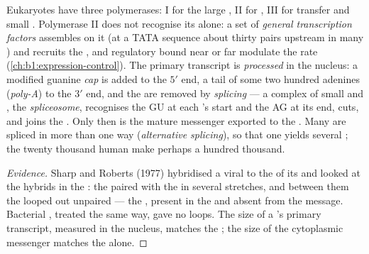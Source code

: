 \begin{proposition}\label{prop:b1:gene-expression:processing}
Eukaryotes have three polymerases: I for the large , II
for , III for transfer and small . Polymerase II does
not recognise its  alone: a set of \emph{general transcription
factors} assembles on it (at a TATA sequence about thirty pairs
upstream in many ) and recruits the , and regulatory
 bound near or far modulate the rate
(\cref{ch:b1:expression-control}). The primary transcript is
\emph{processed} in the nucleus: a modified guanine \emph{cap} is added
to the $5'$ end, a tail of some two hundred adenines (\emph{poly-A})
to the $3'$ end, and the  are removed by \emph{splicing} --- a
complex of small  and , the \emph{spliceosome}, recognises
the GU at each 's start and the AG at its end, cuts, and joins
the . Only then is the mature messenger exported to the .
Many  are spliced in more than one way (\emph{alternative
splicing}), so that one  yields several ; the twenty
thousand human  make perhaps a hundred thousand.
\end{proposition}
\begin{proof}[Evidence]
Sharp and Roberts (1977) hybridised a viral  to the 
of its  and looked at the hybrids in the : the
 paired with the  in several stretches, and between them the
 looped out unpaired --- the , present in the  and
absent from the message. Bacterial , treated the same way, gave
no loops. The size of a 's primary transcript, measured in the
nucleus, matches the ; the size of the cytoplasmic messenger
matches the  alone.
\end{proof}

